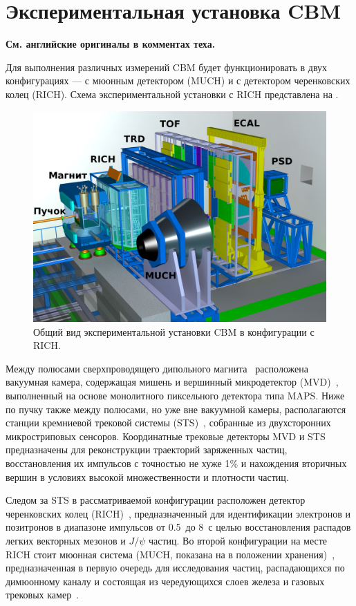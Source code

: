 \section{Экспериментальная установка CBM}\label{sec:secCbmSetup}

\textbf{См. английские оригиналы в комментах теха.}

Для выполнения различных измерений CBM будет функционировать в двух конфигурациях --- с мюонным детектором (MUCH) и с детектором черенковских колец (RICH). Схема экспериментальной установки с RICH представлена на .

\begin{figure}[H]
\includegraphics[width=1.0\textwidth]{pictures/1_CBM_SIS100_with_names.png}
\caption{Общий вид экспериментальной установки CBM в конфигурации с RICH.}
\label{fig:CBM}
\end{figure}

Между полюсами сверхпроводящего дипольного магнита~\cite{TDR_Magnet} расположена вакуумная камера, содержащая мишень и вершинный микродетектор (MVD)~\cite{MVD_KOZIEL}, выполненный на основе монолитного пиксельного детектора типа MAPS. Ниже по пучку также между полюсами, но уже вне вакуумной камеры, располагаются станции кремниевой трековой системы (STS)~\cite{TDR_STS}, собранные из двухсторонних микростриповых сенсоров. Координатные трековые детекторы MVD и STS предназначены для реконструкции траекторий заряженных частиц, восстановления их импульсов с точностью не хуже 1\% и нахождения вторичных вершин в условиях высокой множественности и плотности частиц.

Следом за STS в рассматриваемой конфигурации расположен детектор черенковских колец (RICH)~\cite{TDR_RICH}, предназначенный для идентификации электронов и позитронов в диапазоне импульсов от 0.5~\GeVoverC до 8~\GeVoverC с целью восстановления распадов легких векторных мезонов и $ J / \psi $ частиц. Во второй конфигурации на месте RICH стоит мюонная система (MUCH, показана на  в положении хранения)~\cite{TDR_MUCH}, предназначенная в первую очередь для исследования частиц, распадающихся по димюонному каналу и состоящая из чередующихся слоев железа и газовых трековых камер~\cite{GEM}.

